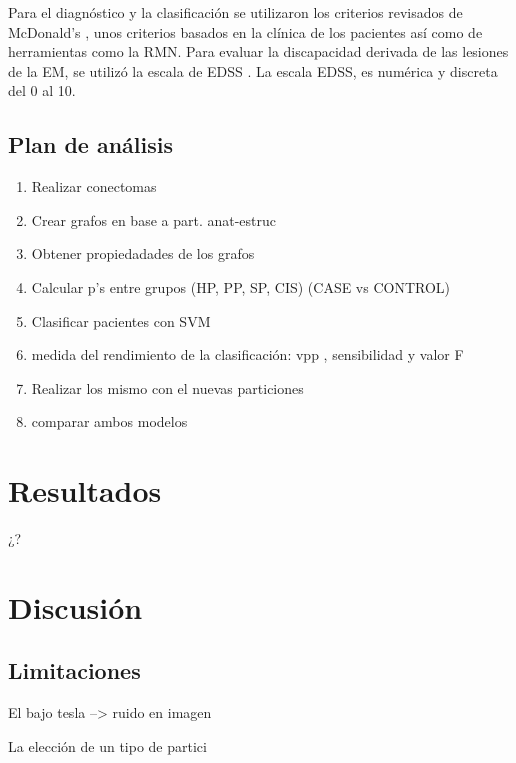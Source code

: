 \documentclass[fleqn,10pt]{UICArticle} %
\begin{document}
Para el diagnóstico y la clasificación se utilizaron los criterios revisados de McDonald's \cite{Polman2011}, unos criterios basados en la clínica de los pacientes así como de herramientas como la RMN. Para evaluar la discapacidad derivada de las lesiones de la EM, se utilizó la escala de EDSS \cite{Kurtzke1983}. La escala EDSS, es numérica y discreta del 0 al 10.

\subsection{Plan de análisis}

\begin{enumerate}[noitemsep]
\item Realizar conectomas
\item Crear grafos en base a part. anat-estruc
\item Obtener propiedadades de los grafos
\item Calcular p's entre grupos (HP, PP, SP, CIS) (CASE vs CONTROL) %
\item Clasificar pacientes con SVM
\item medida del rendimiento de la clasificación: vpp , sensibilidad y valor F
\item Realizar los mismo con el nuevas particiones
\item comparar ambos modelos
\end{enumerate}

\section{Resultados}
¿?

\section{Discusión}

\subsection{Limitaciones}

\begin{list}{-}{spacing}
\item El bajo tesla --> ruido en imagen
\item La elección de un tipo de partici
\end{list}
\end{document}
